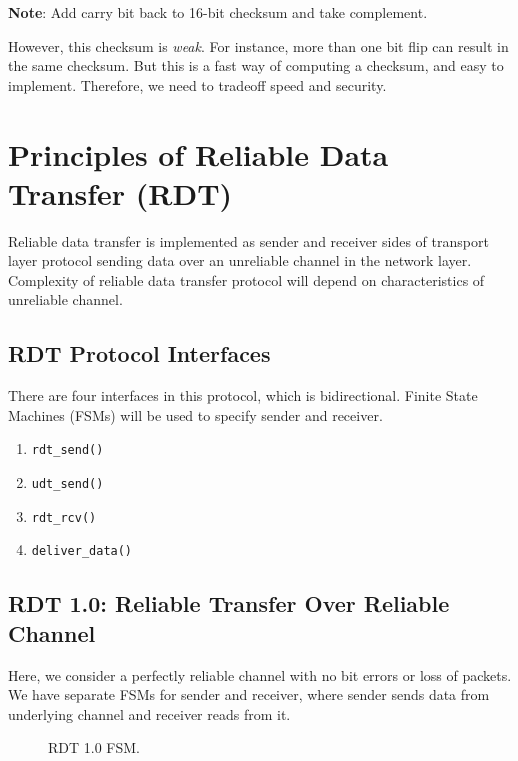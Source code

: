 \documentclass[twoside]{article}
\begin{document}
\textbf{Note}: Add carry bit back to 16-bit checksum and take complement.

However, this checksum is \emph{weak}. For instance, more than one bit flip can result in the same checksum. But this is a fast way of computing a checksum, and easy to implement. Therefore, we need to tradeoff speed and security.

\section{Principles of Reliable Data Transfer (RDT)}

Reliable data transfer is implemented as sender and receiver sides of transport layer protocol sending data over an unreliable channel in the network layer. Complexity of reliable data transfer protocol will depend on characteristics of unreliable channel.

\subsection{RDT Protocol Interfaces}

There are four interfaces in this protocol, which is bidirectional. Finite State Machines (FSMs) will be used to specify sender and receiver.

\begin{enumerate}
    \item \texttt{rdt\_send()}
    \item \texttt{udt\_send()}
    \item \texttt{rdt\_rcv()}
    \item \texttt{deliver\_data()}
\end{enumerate}

\subsection{RDT 1.0: Reliable Transfer Over Reliable Channel}

Here, we consider a perfectly reliable channel with no bit errors or loss of packets. We have separate FSMs for sender and receiver, where sender sends data from underlying channel and receiver reads from it.

\begin{figure}[!ht]
\centering
{}
\caption{RDT 1.0 FSM.}
\label{fig:rdt-1.0-fsm}
\end{figure}
\end{document}

